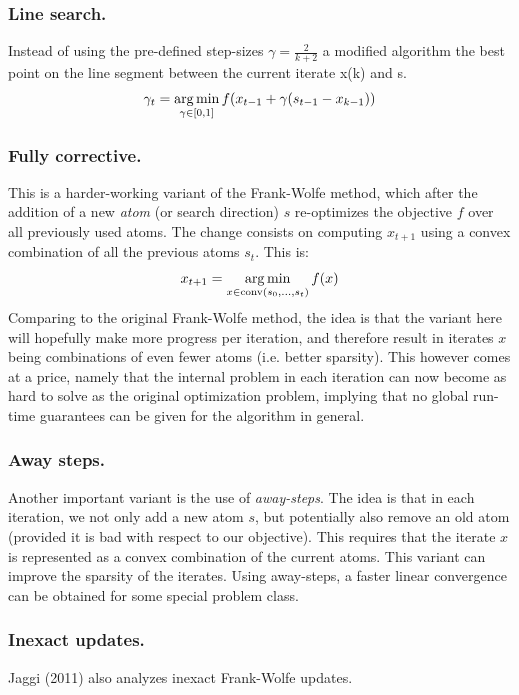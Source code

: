 \subsubsection{Line search.}

Instead of using the pre-defined step-sizes $\gamma=\frac{2}{k+2}$ a modified algorithm the best point on the line segment between the current iterate x(k) and s.
\begin{equation}
\gamma_t = \operatorname*{arg\,min}_{\gamma \in [0,1]} f( x_{t-1} + \gamma(s_{t-1}-x_{k-1}) ) \nonumber
\end{equation}

\subsubsection{Fully corrective.}

This is a harder-working variant of the Frank-Wolfe method, which after the addition of a new \emph{atom} (or search direction) $s$ re-optimizes the objective $f$ over all previously used atoms. The change consists on computing $x_{t+1}$ using a convex combination of all the previous atoms $s_t$. This is:
\begin{equation}
x_{t+1} = \operatorname*{arg\,min}_{x \in \text{conv}(s_0,\ldots,s_{t}) } f(x)
\end{equation}
Comparing to the original Frank-Wolfe method, the idea is that the variant here will hopefully make more progress per iteration, and therefore result in iterates $x$ being combinations of even fewer atoms (i.e. better sparsity). This however comes at a price, namely that the internal problem in each iteration can now become as hard to solve as the original optimization problem, implying that no global run-time guarantees can be given for the algorithm in general.

\subsubsection{Away steps.}
Another important variant is the use of \emph{away-steps}. The idea is that in each iteration, we not only add a new atom $s$, but potentially also remove an old atom (provided it is bad with respect to our objective). This requires that the iterate $x$ is represented as a convex combination of the current atoms. This variant can improve the sparsity of the iterates. Using away-steps, a faster linear convergence can be obtained for some special problem class.

\subsubsection{Inexact updates.}
Jaggi (2011) also analyzes inexact Frank-Wolfe updates.

